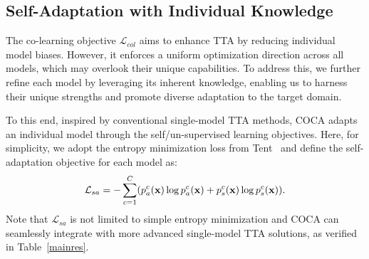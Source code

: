 



\subsection{Self-Adaptation with Individual Knowledge}
\label{se}

The co-learning objective $\mathcal{L}_{col}$ aims to enhance TTA by reducing individual model biases. However, it enforces a uniform optimization direction across all models, which may overlook their unique capabilities. To address this, we further refine each model by leveraging its inherent knowledge, enabling us to harness their unique strengths and promote diverse adaptation to the target domain.

To this end, inspired by conventional single-model TTA methods, COCA adapts an individual model through the self/un-supervised learning objectives. Here, for simplicity, we adopt the entropy minimization loss from Tent~\cite{wang2020tent} and define the self-adaptation objective for each model as:
\begin{equation}
    \mathcal{L}_{sa} = - \sum_{c=1}^C (p_{a}^c(\mathbf{x})\log p_{a}^c(\mathbf{x}) + p_{s}^c(\mathbf{x})\log p_{s}^c(\mathbf{x})).
    \label{selfloss}
\end{equation}
Note that $\mathcal{L}_{sa} $ is not limited to simple entropy minimization and COCA can seamlessly integrate with more advanced single-model TTA solutions, as verified in Table~\ref{mainres}.

